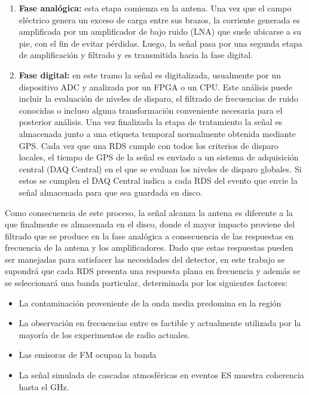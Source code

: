 	\begin{enumerate}
		\item \textbf{Fase anal\'ogica:} esta etapa comienza en la antena. Una vez que el campo el\'ectrico genera un exceso de carga entre sus brazos, la corriente generada es amplificada por un amplificador de bajo ruido (LNA) que suele ubicarse a su pie, con el fin de evitar p\'erdidas. Luego, la se\~nal pasa por una segunda etapa de amplificaci\'on y filtrado y es transmitida hacia la fase digital.
		\item \textbf{Fase digital:} en este tramo la se\~nal es digitalizada, usualmente por un dispositivo ADC y analizada por un FPGA o un CPU. Este an\'alisis puede incluir la evaluaci\'on de niveles de disparo, el filtrado de frecuencias de ruido conocidas o incluso alguna transformaci\'on conveniente necesaria para el posterior an\'alisis. Una vez finalizada la etapa de tratamiento la se\~nal es almacenada junto a una etiqueta temporal normalmente obtenida mediante GPS. 
		Cada vez que una RDS cumple con todos los criterios de disparo locales, el tiempo de GPS de la se\~nal es enviado a un sistema de adquisici\'on central (DAQ Central) en el que se evaluan los niveles de disparo globales.
		Si estos se cumplen el DAQ Central indica a cada RDS del evento que envie la se\~nal almacenada para que sea guardada en disco.
	\end{enumerate}
	
	Como consecuencia de este proceso, la se\~nal alcanza la antena es diferente a la que finalmente es almacenada en el disco, donde el mayor impacto proviene del filtrado que se produce en la fase anal\'ogica a consecuencia de las respuestas en frecuencia de la antena y los amplificadores.
	Dado que estas respuestas pueden ser manejadas para satisfacer las necesidades del detector, en este trabajo se supondr\'a que cada RDS presenta una respuesta plana en frecuencia y adem\'as se se seleccionar\'a una banda particular, determinada por los siguientes factores:
	\begin{itemize}
	 \item La contaminaci\'on proveniente de la onda media predomina en la regi\'on 
	 \item La observaci\'on en frecuencias entre  es factible y actualmente utilizada por la mayor\'ia de los experimentos de radio actuales.
	 \item Las emisoras de FM ocupan la banda 
	 \item La se\~nal simulada de cascadas atmosf\'ericas en eventos ES muestra coherencia hasta el GHz.
	\end{itemize}
	
